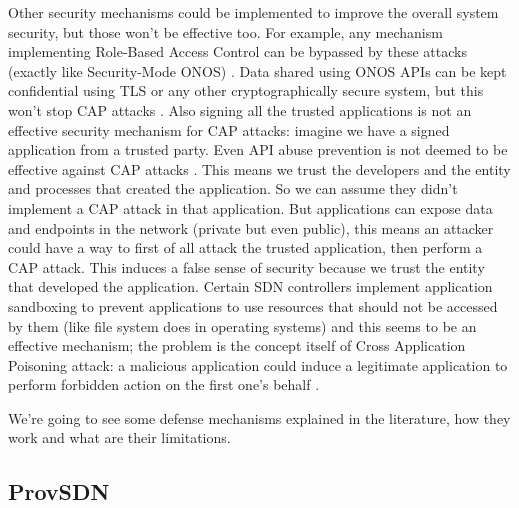 \documentclass[a4paper,10pt]{memoir}
\begin{document}
Other security mechanisms could be implemented to improve the overall system security, but those won't be effective too. For example, any mechanism implementing Role-Based Access Control can be bypassed by these attacks (exactly like Security-Mode ONOS) \cite{secmode}. Data shared using ONOS APIs can be kept confidential using TLS or any other cryptographically secure system, but this won't stop CAP attacks \cite{tlsapis}. Also signing all the trusted applications is not an effective security mechanism for CAP attacks: imagine we have a signed application from a trusted party. Even API abuse prevention is not deemed to be effective against CAP attacks \cite{aegis,dac}. This means we trust the developers and the entity and processes that created the application. So we can assume they didn't implement a CAP attack in that application. But applications can expose data and endpoints in the network (private but even public), this means an attacker could have a way to first of all attack the trusted application, then perform a CAP attack. This induces a false sense of security because we trust the entity that developed the application. Certain SDN controllers implement application sandboxing to prevent applications to use resources that should not be accessed by them (like file system does in operating systems) and this seems to be an effective mechanism; the problem is the concept itself of Cross Application Poisoning attack: a malicious application could induce a legitimate application to perform forbidden action on the first one's behalf \cite{rosemary}.

\medskip
We're going to see some defense mechanisms explained in the literature, how they work and what are their limitations.


\subsection{ProvSDN}
\end{document}
